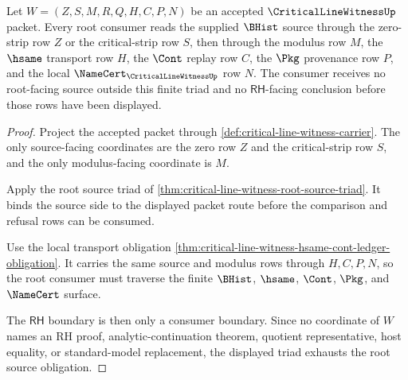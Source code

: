 \begin{theorem}
\label{thm:critical-line-witness-root-source-obligation-triad}
Let $W=(Z,S,M,R,Q,H,C,P,N)$ be an accepted $\CriticalLineWitnessUp$ packet. Every root consumer reads the supplied $\BHist$ source through the zero-strip row $Z$ or the critical-strip row $S$, then through the modulus row $M$, the $\hsame$ transport row $H$, the $\Cont$ replay row $C$, the $\Pkg$ provenance row $P$, and the local $\NameCert_{\CriticalLineWitnessUp}$ row $N$. The consumer receives no root-facing source outside this finite triad and no $\mathsf{RH}$-facing conclusion before those rows have been displayed.
\end{theorem}
\begin{proof}
Project the accepted packet through \autoref{def:critical-line-witness-carrier}. The only source-facing coordinates are the zero row $Z$ and the critical-strip row $S$, and the only modulus-facing coordinate is $M$.

Apply the root source triad of \autoref{thm:critical-line-witness-root-source-triad}. It binds the source side to the displayed packet route before the comparison and refusal rows can be consumed.

Use the local transport obligation \autoref{thm:critical-line-witness-hsame-cont-ledger-obligation}. It carries the same source and modulus rows through $H,C,P,N$, so the root consumer must traverse the finite $\BHist$, $\hsame$, $\Cont$, $\Pkg$, and $\NameCert$ surface.

The $\mathsf{RH}$ boundary is then only a consumer boundary. Since no coordinate of $W$ names an RH proof, analytic-continuation theorem, quotient representative, host equality, or standard-model replacement, the displayed triad exhausts the root source obligation.
\end{proof}

